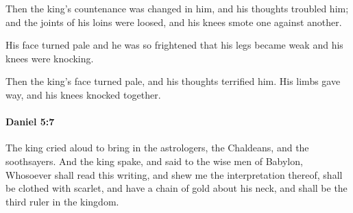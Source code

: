 			\begin{versebox}
					\item[BHS] 
					\item[LXX] 
					\item[ASV] Then the king's countenance was changed in him, and his thoughts troubled him; and the joints of his loins were loosed, and his knees smote one against another.
					\item[NIV] His face turned pale and he was so frightened that his legs became weak and his knees were knocking.
					\item[NRSV] Then the king’s face turned pale, and his thoughts terrified him. His limbs gave way, and his knees knocked together.
			\end{versebox}

		\paragraph{Daniel 5:7} %
			\label{DANIEL-5-7}

			The king cried aloud to bring in the astrologers, the Chaldeans, and the soothsayers. And the king spake, and said to the wise men of Babylon, Whosoever shall read this writing, and shew me the interpretation thereof, shall be clothed with scarlet, and have a chain of gold about his neck, and shall be the third ruler in the kingdom.

